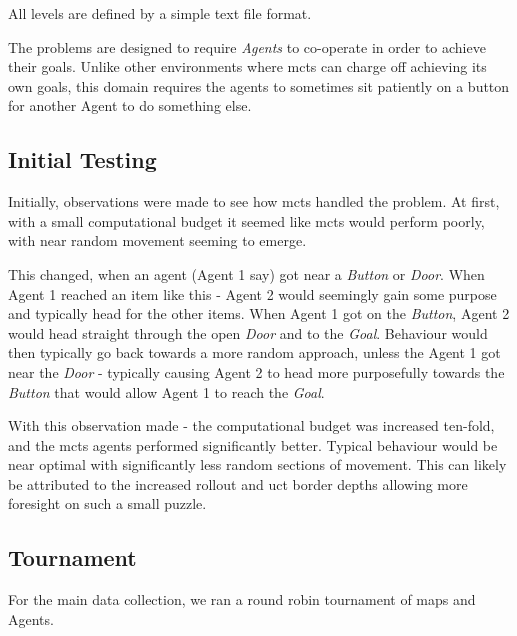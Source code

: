 \documentclass{IEEEtran}
\begin{document}
All levels are defined by a simple text file format.

The problems are designed to require \emph{Agents} to co-operate in order to achieve their goals. Unlike other environments where \gls{mcts} can charge off achieving its own goals, this domain requires the agents to sometimes sit patiently on a button for another Agent to do something else.

\subsection{Initial Testing}
Initially, observations were made to see how \gls{mcts} handled the problem. At first, with a small computational budget it seemed like \gls{mcts} would perform poorly, with near random movement seeming to emerge.

This changed, when an agent (Agent 1 say) got near a \emph{Button} or \emph{Door}. When Agent 1 reached an item like this - Agent 2 would seemingly gain some purpose and typically head for the other items. When Agent 1 got on the \emph{Button}, Agent 2 would head straight through the open \emph{Door} and to the \emph{Goal}. Behaviour would then typically go back towards a more random approach, unless the Agent 1 got near the \emph{Door} - typically causing Agent 2 to head more purposefully towards the \emph{Button} that would allow Agent 1 to reach the \emph{Goal}.

With this observation made - the computational budget was increased ten-fold, and the \gls{mcts} agents performed significantly better. Typical behaviour would be near optimal with significantly less random sections of movement. This can likely be attributed to the increased rollout and \gls{uct} border depths allowing more foresight on such a small puzzle.
\subsection{Tournament}
For the main data collection, we ran a round robin tournament of maps and Agents.
\end{document}
